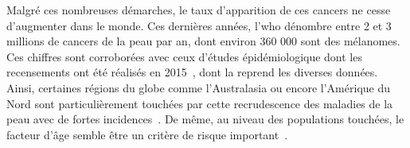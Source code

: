 Malgré ces nombreuses démarches, le taux d’apparition de ces cancers ne cesse d’augmenter dans le monde. Ces dernières années, l'\gls{who} dénombre entre 2 et 3 millions de cancers de la peau par an, dont environ 360 000 sont des mélanomes. Ces chiffres sont corroborées avec ceux d'études épidémiologique dont les recensements ont été réalisés en 2015~\cite{Vos2016}, dont la  reprend les diverses données. Ainsi, certaines régions du globe comme l'Australasia ou encore l'Amérique du Nord sont particulièrement touchées par cette recrudescence des maladies de la peau avec de fortes incidences~\cite{Karimkhani2017}. De même, au niveau des populations touchées, le facteur d'âge semble être un critère de risque important~\cite{Karimkhani2017}.\par 

